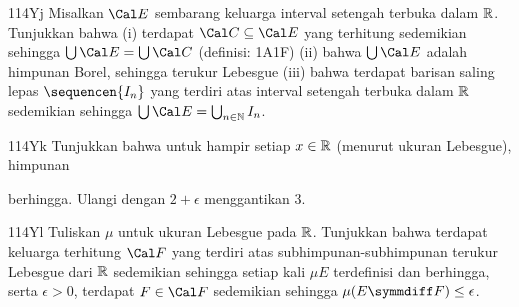 {\spheader 114Yj Misalkan $\Cal E$ sembarang keluarga interval setengah
terbuka dalam $\Bbb R$. Tunjukkan bahwa (i) terdapat
$\Cal C\subseteq\Cal E$ yang terhitung sedemikian sehingga
$\bigcup\Cal E=\bigcup\Cal C$ (definisi:
1A1F) (ii) bahwa $\bigcup\Cal E$ adalah himpunan Borel, sehingga
terukur Lebesgue (iii) bahwa terdapat barisan saling lepas
$\sequencen{I_n}$ yang terdiri atas interval setengah terbuka dalam
$\Bbb R$ sedemikian sehingga
$\bigcup\Cal E=\bigcup_{n\in\Bbb N}I_n$.

\spheader 114Yk Tunjukkan bahwa untuk hampir setiap $x\in\Bbb R$
(menurut ukuran Lebesgue), himpunan


\noindent berhingga.  Ulangi dengan $2+\epsilon$ menggantikan $3$.

\spheader 114Yl Tuliskan $\mu$ untuk ukuran Lebesgue pada $\Bbb R$.
Tunjukkan bahwa terdapat keluarga terhitung $\Cal F$ yang terdiri atas
subhimpunan-subhimpunan terukur Lebesgue dari $\Bbb R$ sedemikian
sehingga setiap kali $\mu E$ terdefinisi dan berhingga, serta
$\epsilon>0$, terdapat $F\in\Cal F$ sedemikian sehingga
$\mu(E\symmdiff F)\le\epsilon$. 
}%

